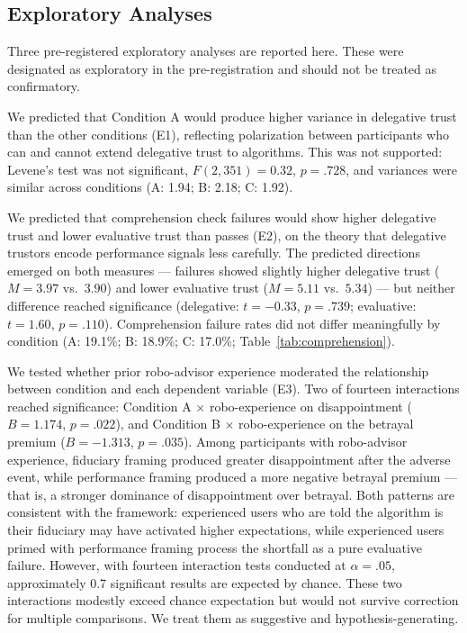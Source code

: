 \subsection{Exploratory Analyses}

Three pre-registered exploratory analyses are reported here. These were designated as exploratory in the pre-registration and should not be treated as confirmatory.

We predicted that Condition A would produce higher variance in delegative trust than the other conditions (E1), reflecting polarization between participants who can and cannot extend delegative trust to algorithms. This was not supported: Levene's test was not significant, $F(2, 351) = 0.32$, $p = .728$, and variances were similar across conditions (A: 1.94; B: 2.18; C: 1.92).

We predicted that comprehension check failures would show higher delegative trust and lower evaluative trust than passes (E2), on the theory that delegative trustors encode performance signals less carefully. The predicted directions emerged on both measures --- failures showed slightly higher delegative trust ($M = 3.97$ vs.\ $3.90$) and lower evaluative trust ($M = 5.11$ vs.\ $5.34$) --- but neither difference reached significance (delegative: $t = -0.33$, $p = .739$; evaluative: $t = 1.60$, $p = .110$). Comprehension failure rates did not differ meaningfully by condition (A: 19.1\%; B: 18.9\%; C: 17.0\%; Table~\ref{tab:comprehension}).



We tested whether prior robo-advisor experience moderated the relationship between condition and each dependent variable (E3). Two of fourteen interactions reached significance: Condition A $\times$ robo-experience on disappointment ($B = 1.174$, $p = .022$), and Condition B $\times$ robo-experience on the betrayal premium ($B = -1.313$, $p = .035$). Among participants with robo-advisor experience, fiduciary framing produced greater disappointment after the adverse event, while performance framing produced a more negative betrayal premium --- that is, a stronger dominance of disappointment over betrayal. Both patterns are consistent with the framework: experienced users who are told the algorithm is their fiduciary may have activated higher expectations, while experienced users primed with performance framing process the shortfall as a pure evaluative failure. However, with fourteen interaction tests conducted at $\alpha = .05$, approximately 0.7 significant results are expected by chance. These two interactions modestly exceed chance expectation but would not survive correction for multiple comparisons. We treat them as suggestive and hypothesis-generating.

